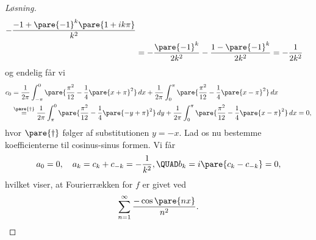 \begin{opg}[Fourierrækker II]
\begin{enumerate}
\begin{proof}[Løsning]
\begin{align*}
{                - \frac{-1+\pare{-1}^k\pare{1+ik\pi}}{k^2}} \\
            &= -\frac{\pare{-1}^k}{2k^2} - \frac{1 - \pare{-1}^k}{2k^2}
                = - \frac{1}{2k^2}
	\end{align*}
	og endelig får vi 
	\begin{align*}
	    c_0 &= \frac{1}{2\pi}\int_{-\pi}^0 \pare{\frac{\pi^2}{12}
	            - \frac{1}{4}\pare{x+\pi}^2}\, dx 
                + \frac{1}{2\pi}\int_0^\pi \pare{\frac{\pi^2}{12}
	            - \frac{1}{4}\pare{x-\pi}^2}\, dx \\
            &\overset{\pare{\dagger}}{=} \frac{1}{2\pi}\int_\pi^0 \pare{\frac{\pi^2}{12}
	            - \frac{1}{4}\pare{-y+\pi}^2}\, dy 
                + \frac{1}{2\pi}\int_0^\pi \pare{\frac{\pi^2}{12}
	            - \frac{1}{4}\pare{x-\pi}^2}\, dx
	         = 0,
	\end{align*}
	hvor $\pare{\dagger}$ følger af substitutionen $y = -x$. Lad os nu bestemme koefficienterne til cosinus-sinus formen. Vi får
	$$ a_0 = 0, \quad a_k = c_k + c_{-k} = - \frac{1}{k^2}, \QUAD
	    b_k = i\pare{c_k - c_{-k}} = 0, $$
	hvilket viser, at Fourierrækken for $f$ er givet ved
	$$ \sum_{n=1}^\infty \frac{-\cos\pare{nx}}{n^2}. $$
	\end{proof}\fi
\end{enumerate}
\end{opg}


